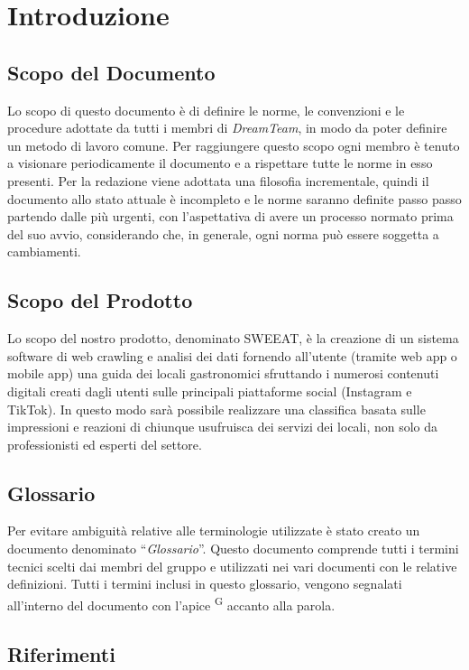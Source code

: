 \section{Introduzione}

\subsection{Scopo del Documento}
Lo scopo di questo documento è di definire le norme, le convenzioni e le procedure adottate da tutti i membri di \textit{DreamTeam}, in modo da poter definire un metodo di lavoro comune.
Per raggiungere questo scopo ogni membro è tenuto a visionare periodicamente il documento e a rispettare tutte le norme in esso presenti. 
Per la redazione viene adottata una filosofia incrementale, quindi il documento allo stato attuale è incompleto e le norme saranno definite passo passo partendo dalle più urgenti, con l'aspettativa di avere un processo normato prima del suo avvio, considerando che, in generale, ogni norma può essere soggetta a cambiamenti.


\subsection{Scopo del Prodotto}
Lo scopo del nostro prodotto, denominato SWEEAT, è la creazione di un sistema software di web crawling e analisi dei dati fornendo all'utente (tramite web app o mobile app) una guida dei locali gastronomici sfruttando i numerosi contenuti digitali creati dagli utenti sulle principali piattaforme social (Instagram e TikTok). In questo modo sarà possibile realizzare una classifica basata sulle impressioni e reazioni di chiunque usufruisca dei servizi dei locali, non solo da professionisti ed esperti del settore.

\subsection{Glossario}
Per evitare ambiguità relative alle terminologie utilizzate è stato creato un documento denominato “\textit{Glossario}”. Questo documento comprende tutti i termini tecnici scelti dai membri del gruppo e utilizzati nei vari documenti con le relative definizioni. Tutti i termini inclusi in questo glossario, vengono segnalati all’interno del documento con l’apice \textsuperscript{G} accanto alla parola.

\subsection{Riferimenti}
